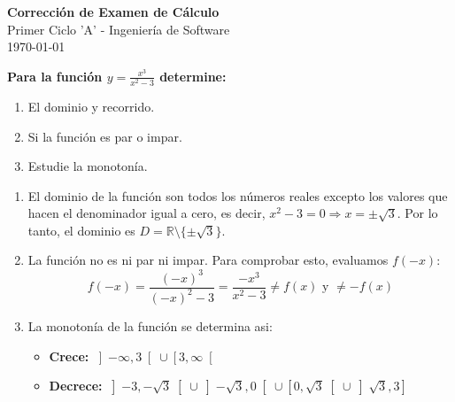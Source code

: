 \documentclass[12pt,answers]{exam}
\begin{document}
\begin{center}
    \Large\textbf{Corrección de Examen de Cálculo}\\[1em]
    \large Primer Ciclo 'A' - Ingeniería de Software\\[1em]
    \large \today
\end{center}

\vspace{0.5cm}

\begin{questions}

\question \large\textbf{Para la función $\displaystyle y = \frac{x^3}{x^2 - 3} $ determine:}
\begin{enumerate}[label=\alph*.]
    \item El dominio y recorrido.
    \item Si la función es par o impar.
    \item Estudie la monotonía.
\end{enumerate}
\begin{solution}
\begin{enumerate}[label=\alph*.]
    \item El dominio de la función son todos los números reales excepto los valores que hacen el denominador igual a cero, es decir, $x^2 - 3 = 0 \Rightarrow x = \pm\sqrt{3}$. Por lo tanto, el dominio es $D = \mathbb{R} \setminus \{\pm\sqrt{3}\}$.
    
    \item La función no es ni par ni impar. Para comprobar esto, evaluamos $f(-x)$:
    \[
    f(-x) = \frac{(-x)^3}{(-x)^2 - 3} = \frac{-x^3}{x^2 - 3} \neq f(x) \text{ y } \neq -f(x)
    \]

    \item La monotonía de la función se determina asi:
    \begin{itemize}
      \item \normalsize\textbf{Crece:} $\displaystyle 
      \left]-\infty, 3\right[\cup \left[3, \infty\right[
      $
      \item \normalsize\textbf{Decrece:} $\displaystyle 
      \left]-3, -\sqrt{3}\right[\cup \left]-\sqrt{3}, 0\right[\cup \left[0, \sqrt{3}\right[\cup \left]\sqrt{3}, 3\right]
      $
    \end{itemize}
\end{enumerate}
\vspace{0.5cm}


\end{solution}
\end{questions}
\end{document}
